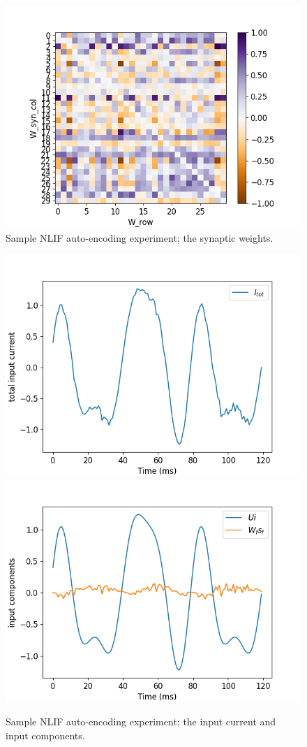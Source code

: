 \documentclass[mphil,deptreport,ianc]{infthesis} %
\begin{document}
\begin{figure}[!h]
    \centering
    \includegraphics[width=0.6\columnwidth]{figures/Supplementary/gating/NLIF/AutoEncoding/01-04_16-42-46-568/test_heatmap_W.png}
    \caption{Sample NLIF auto-encoding experiment; the synaptic weights.}
    \label{fig:NLIF_AE_1_W_syn}
\end{figure}


\begin{figure}[!h]
    \centering
    \includegraphics[width=0.49\columnwidth]{figures/Supplementary/gating/NLIF/AutoEncoding/01-04_16-42-46-568/test_plot_I_tot_NLIF_seed_24.png}
    \includegraphics[width=0.49\columnwidth]{figures/Supplementary/gating/NLIF/AutoEncoding/01-04_16-42-46-568/test_plot_input_components_NLIF_seed_24.png}
    \caption{Sample NLIF auto-encoding experiment; the input current and input components.}
    \label{fig:NLIF_AE_1_I_tot_in_comp}
\end{figure}
\end{document}
